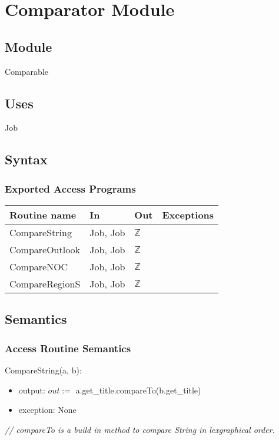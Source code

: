 \documentclass[12pt]{article}
\begin{document}
\section* {Comparator Module}

\subsection* {Module}

Comparable

\subsection* {Uses}

Job

\subsection* {Syntax}

\subsubsection* {Exported Access Programs}

\begin{tabular}{| l | l | l | p{6cm} |}
\hline
\textbf{Routine name} & \textbf{In} & \textbf{Out} & \textbf{Exceptions}\\
\hline
CompareString & Job, Job & $\mathbb{Z}$ & \\
\hline
CompareOutlook & Job, Job & $\mathbb{Z}$ & \\
\hline
CompareNOC & Job, Job & $\mathbb{Z}$ & \\
\hline
CompareRegionS & Job, Job & $\mathbb{Z}$ & \\
\hline
\end{tabular}

\subsection* {Semantics}

\subsubsection* {Access Routine Semantics}

\noindent CompareString(a, b):
\begin{itemize}
\item output: $out := $ a.get\_title.compareTo(b.get\_title)
\item exception: None
\end{itemize}
\noindent \textit{// compareTo is a build in method to compare String in lexgraphical order.}\\
\end{document}
